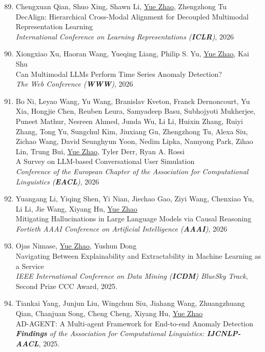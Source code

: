 \documentclass[margin,line,pifont,palatino,courier]{res}
\newenvironment{benumerate}[1]{
    \let\oldItem\item
    \def\item{\addtocounter{enumi}{-2}\oldItem}
    \begin{enumerate}[leftmargin=0.25in,label=\textcolor{uscred}{\arabic*.}]
    \setcounter{enumi}{#1}
    \addtocounter{enumi}{1}
}{
    \end{enumerate}
}
\begin{document}
\begin{resume}
\begin{benumerate}{88}
    \item Chengxuan Qian, Shuo Xing, Shawn Li, \underline{Yue Zhao}, Zhengzhong Tu\\
    DecAlign: Hierarchical Cross-Modal Alignment for Decoupled Multimodal Representation Learning\\
    {\textit{International Conference on Learning Representations (\textbf{ICLR})}, 2026}

    \item Xiongxiao Xu, Haoran Wang, Yueqing Liang, Philip S. Yu, \underline{Yue Zhao}, Kai Shu\\
    Can Multimodal LLMs Perform Time Series Anomaly Detection?\\
    \textit{The Web Conference (\textbf{WWW})}, 2026

    \item 
    Bo Ni, Leyao Wang, Yu Wang, Branislav Kveton, Franck Dernoncourt, Yu Xia, Hongjie Chen, Reuben Leura, Samyadeep Basu, Subhojyoti Mukherjee, Puneet Mathur, Nesreen Ahmed, Junda Wu, Li Li, Huixin Zhang, Ruiyi Zhang, Tong Yu, Sungchul Kim, Jiuxiang Gu, Zhengzhong Tu, Alexa Siu, Zichao Wang, David Seunghyun Yoon, Nedim Lipka, Namyong Park, Zihao Lin, Trung Bui, \underline{Yue Zhao}, Tyler Derr, Ryan A. Rossi \\
    A Survey on LLM-based Conversational User Simulation \\
    \textit{Conference of the European Chapter of the Association for Computational Linguistics (\textbf{EACL})}, 2026

    \item Yuangang Li, Yiqing Shen, Yi Nian, Jiechao Gao, Ziyi Wang, Chenxiao Yu, Li Li, Jie Wang, Xiyang Hu, \underline{Yue Zhao}\\
    Mitigating Hallucinations in Large Language Models via Causal Reasoning\\
    \textit{Fortieth AAAI Conference on Artificial Intelligence (\textbf{AAAI})}, 2026


    \item Ojas Nimase, \underline{Yue Zhao}, Yushun Dong\\
    Navigating Between Explainability and Extractability in Machine Learning as a Service\\
    \textit{IEEE International Conference on Data Mining (\textbf{ICDM}) BlueSky Track}, 
    \textcolor{uscred}{\faAward \xspace Second Prize CCC Award}, 2025.

    \item Tiankai Yang, Junjun Liu, Wingchun Siu, Jiahang Wang, Zhuangzhuang Qian, Chanjuan Song, Cheng Cheng, Xiyang Hu, \underline{Yue Zhao}\\
    AD-AGENT: A Multi-agent Framework for End-to-end Anomaly Detection\\
    \textit{\textbf{Findings} of the Association for Computational Linguistics: \textbf{IJCNLP-AACL}}, 2025.


\end{benumerate}
\end{resume}
\end{document}
